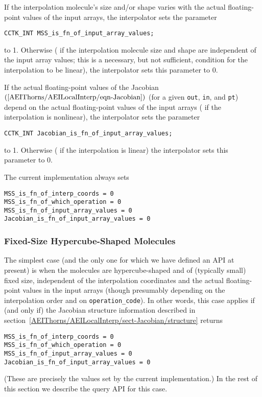 If the interpolation molecule's size and/or shape varies with the
actual floating-point values of the input arrays, the interpolator
sets the parameter
\begin{verbatim}
CCTK_INT MSS_is_fn_of_input_array_values;
\end{verbatim}
to 1.  Otherwise (\ie{} if the interpolation molecule size and shape
are independent of the input array values; this is a necessary, but
not sufficient, condition for the interpolation to be linear), the
interpolator sets this parameter to 0.

If the actual floating-point values of the
Jacobian~$(\ref{AEIThorns/AEILocalInterp/eqn-Jacobian})$
(for a given \verb|out|, \verb|in|, and \verb|pt|) depend on the actual
floating-point values of the input arrays (\ie{} if the interpolation
is nonlinear), the interpolator sets the parameter
\begin{verbatim}
CCTK_INT Jacobian_is_fn_of_input_array_values;
\end{verbatim}
to 1.  Otherwise (\ie{} if the interpolation is linear) the interpolator
sets this parameter to 0.

The current implementation always sets
\begin{verbatim}
MSS_is_fn_of_interp_coords = 0
MSS_is_fn_of_which_operation = 0
MSS_is_fn_of_input_array_values = 0
Jacobian_is_fn_of_input_array_values = 0
\end{verbatim}


\subsubsection{Fixed-Size Hypercube-Shaped Molecules}
\label{AEIThorns/AEILocalInterp/sect-Jacobian/fixed-sized-hypercube}

The simplest case (and the only one for which we have defined an
API at present) is when the molecules are hypercube-shaped and of
(typically small) fixed size, independent of the interpolation
coordinates and the actual floating-point values in the input arrays
(though presumably depending on the interpolation order and on
\verb|operation_code|).  In other words, this case applies if
(and only if) the Jacobian structure information described in
section~\ref{AEIThorns/AEILocalInterp/sect-Jacobian/structure}
returns
\begin{verbatim}
MSS_is_fn_of_interp_coords = 0
MSS_is_fn_of_which_operation = 0
MSS_is_fn_of_input_array_values = 0
Jacobian_is_fn_of_input_array_values = 0
\end{verbatim}
(These are precisely the values set by the current implementation.)
In the rest of this section we describe the query API for this case.

